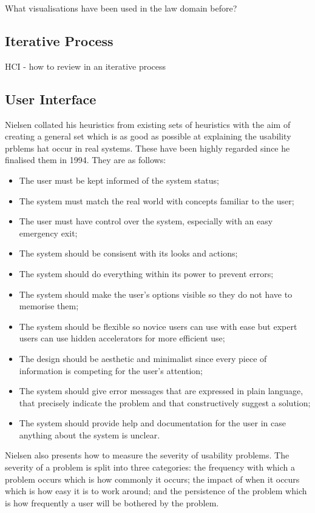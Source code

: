 			What visualisations have been used in the law domain before?
		\subsection{Iterative Process}
			HCI - how to review in an iterative process
		\subsection{User Interface}
			Nielsen collated his heuristics from existing sets of heuristics with the aim of creating a general set which is as good as possible at explaining the usability prblems hat occur in real systems\cite{usability_heuristics_nielsen}. These have been highly regarded since he finalised them in 1994. They are as follows: 
			\begin{itemize}
				\item The user must be kept informed of the system status;
				\item The system must match the real world with concepts familiar to the user;
				\item The user must have control over the system, especially with an easy emergency exit;
				\item The system should be consisent with its looks and actions;
				\item The system should do everything within its power to prevent errors;
				\item The system should make the user's options visible so they do not have to memorise them;
				\item The system should be flexible so novice users can use with ease but expert users can use hidden accelerators for more efficient use;
				\item The design should be aesthetic and minimalist since every piece of information is competing for the user's attention;
				\item The system should give error messages that are expressed in plain language, that precisely indicate the problem and that constructively suggest a solution;
				\item The system should provide help and documentation for the user in case anything about the system is unclear.
			\end{itemize}
			Nielsen also presents how to measure the severity of usability problems. The severity of a problem is split into three categories: the frequency with which a problem occurs which is how commonly it occurs; the impact of when it occurs which is how easy it is to work around; and the persistence of the problem which is how frequently a user will be bothered by the problem. 
